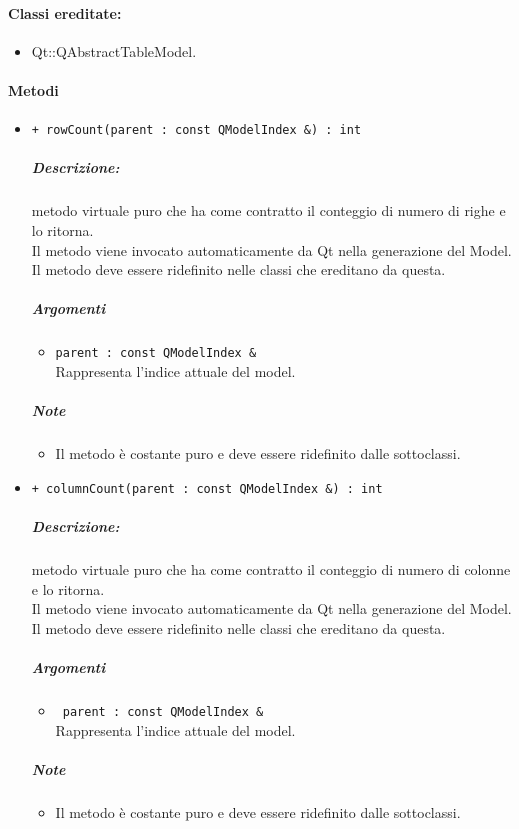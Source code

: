 \paragraph{Classi ereditate:}
\begin{itemize}
	\item Qt::QAbstractTableModel.
\end{itemize}
	
\paragraph{\color{black}Metodi\\}
\begin{itemize}
	\item \color{blue}\verb!+ rowCount(parent : const QModelIndex &) : int!\\
	\color{black}
	\subparagraph{Descrizione:} metodo virtuale puro che ha come contratto il conteggio di numero di righe e lo ritorna.
	\\Il metodo viene invocato automaticamente da Qt\g{} nella generazione del Model.\\
	Il metodo deve essere ridefinito nelle classi che ereditano da questa.
	\subparagraph{Argomenti}
		\begin{itemize}
			\item \color{RoyalPurple}\verb!parent : const QModelIndex &!\\
			\color{Black}Rappresenta l'indice attuale del model.
		\end{itemize}
	\subparagraph{Note}
		\begin{itemize}
			\item Il metodo è costante puro e deve essere ridefinito dalle sottoclassi.
		\end{itemize}
	
	\item \color{blue}\verb!+ columnCount(parent : const QModelIndex &) : int!\\
	\color{black}
	\subparagraph{Descrizione:} metodo virtuale puro che ha come contratto il conteggio di numero di colonne e lo ritorna.\\
	Il metodo viene invocato automaticamente da Qt\g{} nella generazione del Model.\\
	Il metodo deve essere ridefinito nelle classi che ereditano da questa.\\
	\subparagraph{Argomenti}
		\begin{itemize}
			\item \color{RoyalPurple}\verb! parent : const QModelIndex &!\\
			\color{black}Rappresenta l'indice attuale del model.
		\end{itemize}
	\subparagraph{Note}
			\begin{itemize}
				\item Il metodo è costante puro e deve essere ridefinito dalle sottoclassi.
			\end{itemize}
		

\end{itemize}
